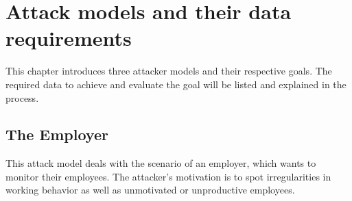 \chapter{Attack models and their data requirements}\label{attack-models}
This chapter introduces three attacker models and their respective goals.
The required data to achieve and evaluate the goal will be listed and explained in the process.


\section{The Employer}\label{employer-monitoring}
This attack model deals with the scenario of an employer, which wants to monitor their employees.
The attacker's motivation is to spot irregularities in working behavior as well as unmotivated or unproductive employees.

